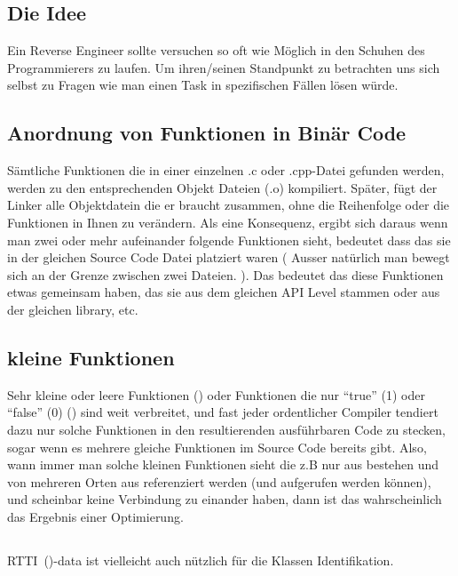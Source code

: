 \subsection{Die Idee}  

Ein Reverse Engineer sollte versuchen so oft wie M\"oglich in den Schuhen des Programmierers zu laufen.
Um ihren/seinen Standpunkt zu betrachten uns sich selbst zu Fragen wie man einen Task in spezifischen F\"allen l\"osen w\"urde.

\subsection{Anordnung von Funktionen in Bin\"ar Code}  

S\"amtliche Funktionen die in einer einzelnen .c oder .cpp-Datei gefunden werden, werden zu den entsprechenden Objekt Dateien (.o) kompiliert. Sp\"ater, f\"ugt der Linker alle Objektdatein die er braucht zusammen, ohne die Reihenfolge oder die Funktionen in Ihnen zu ver\"andern. Als eine Konsequenz, ergibt sich daraus wenn man zwei oder mehr aufeinander folgende Funktionen sieht, bedeutet dass das sie in der gleichen Source Code Datei platziert waren ( Ausser nat\"urlich man bewegt sich an der Grenze zwischen zwei Dateien. ).  Das bedeutet
das diese Funktionen etwas gemeinsam haben, das sie aus dem gleichen \ac{API} Level stammen oder aus der gleichen library, etc.

\subsection{kleine Funktionen} 

Sehr kleine oder leere Funktionen  ()
oder Funktionen die nur ``true'' (1) oder ``false'' (0) () sind weit verbreitet,
und fast jeder ordentlicher Compiler tendiert dazu nur solche Funktionen in den resultierenden ausf\"uhrbaren Code zu stecken,
sogar wenn es mehrere gleiche Funktionen im Source Code bereits gibt. 
Also, wann immer man solche kleinen Funktionen sieht die z.B nur aus  bestehen und von mehreren 
Orten aus referenziert werden (und aufgerufen werden k\"onnen), und scheinbar keine Verbindung zu einander haben, dann 
ist das wahrscheinlich das Ergebnis einer Optimierung. 

\subsection{\Cpp}

\ac{RTTI}~()-data ist vielleicht auch n\"utzlich f\"ur die \Cpp Klassen Identifikation.




